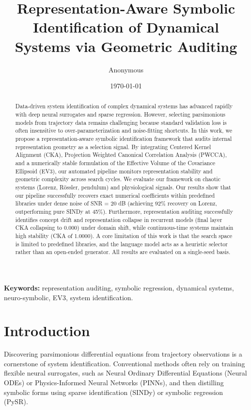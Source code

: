 \documentclass[twocolumn]{article}
\title{\textbf{Representation-Aware Symbolic Identification of Dynamical Systems via Geometric Auditing}}
\author{Anonymous} \\
\date{\today}
\begin{document}
\maketitle

\begin{abstract}
Data-driven system identification of complex dynamical systems has advanced rapidly with deep neural surrogates and sparse regression. However, selecting parsimonious models from trajectory data remains challenging because standard validation loss is often insensitive to over-parameterization and noise-fitting shortcuts. In this work, we propose a representation-aware symbolic identification framework that audits internal representation geometry as a selection signal. By integrating Centered Kernel Alignment (CKA), Projection Weighted Canonical Correlation Analysis (PWCCA), and a numerically stable formulation of the Effective Volume of the Covariance Ellipsoid (EV3), our automated pipeline monitors representation stability and geometric complexity across search cycles. We evaluate our framework on chaotic systems (Lorenz, R\"ossler, pendulum) and physiological signals. Our results show that our pipeline successfully recovers exact numerical coefficients within predefined libraries under dense noise of SNR = 20 dB (achieving 92\% recovery on Lorenz, outperforming pure SINDy at 45\%). Furthermore, representation auditing successfully identifies concept drift and representation collapse in recurrent models (final layer CKA collapsing to 0.000) under domain shift, while continuous-time systems maintain high stability (CKA of 1.0000). A core limitation of this work is that the search space is limited to predefined libraries, and the language model acts as a heuristic selector rather than an open-ended generator. All results are evaluated on a single-seed basis.
\end{abstract}

\textbf{Keywords:} representation auditing, symbolic regression, dynamical systems, neuro-symbolic, EV3, system identification.

\section{Introduction}
\label{sec:intro}
Discovering parsimonious differential equations from trajectory observations is a cornerstone of system identification. Conventional methods often rely on training flexible neural surrogates, such as Neural Ordinary Differential Equations (Neural ODEs) or Physics-Informed Neural Networks (PINNs), and then distilling symbolic forms using sparse identification (SINDy) or symbolic regression (PySR). 
\end{document}
